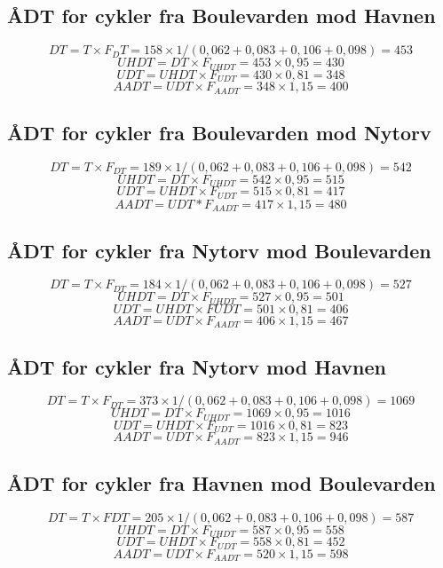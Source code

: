   \subsection{ÅDT for cykler fra Boulevarden mod Havnen}
  \label{sub:cykelaadt}
  $$DT = T \times F_DT = 158 \times 1/(0,062 + 0,083 + 0,106 + 0,098) = 453$$
  $$UHDT = DT \times F_{UHDT} = 453 \times 0,95 = 430$$
  $$UDT = UHDT \times F_{UDT} = 430 \times 0,81 = 348$$
  $$AADT = UDT \times F_{AADT} = 348 \times 1,15 = 400$$


\subsection{ÅDT for cykler fra Boulevarden mod Nytorv}
\label{sub:cykelaadtnytorv}

  $$DT = T \times F_{DT} = 189 \times 1/(0,062+0,083+0,106+0,098) = 542$$
  $$UHDT = DT \times F_{UHDT} = 542 \times 0,95 = 515$$
  $$UDT = UHDT \times F_{UDT} = 515 \times 0,81 = 417$$
  $$AADT = UDT * F_{AADT} = 417 \times 1,15 = 480$$

  \subsection{ÅDT for cykler fra Nytorv mod Boulevarden}
  \label{sub:cykelaadtnytorvb}

  $$DT = T \times F_{DT} = 184 \times 1/(0,062 +0,083+0,106+0,098) = 527$$
  $$UHDT = DT \times F_{UHDT} = 527 \times 0,95 = 501$$
  $$UDT = UHDT \times FUDT = 501 \times 0,81 = 406$$
  $$AADT = UDT \times F_{AADT} = 406 \times 1,15 = 467$$

\subsection{ÅDT for cykler fra Nytorv mod Havnen}
\label{sub:cykelaadtnytorvc}
  $$DT = T \times F_{DT} = 373 \times 1/(0,062 +0,083+0,106+0,098) = 1069$$
  $$UHDT = DT \times F_{UHDT} = 1069 \times 0,95 = 1016$$
  $$UDT = UHDT \times F_{UDT} = 1016 \times 0,81 = 823$$
  $$AADT = UDT \times F_{AADT} = 823 \times 1,15 = 946$$


\subsection{ÅDT for cykler fra Havnen mod Boulevarden}
\label{sub:cykelaadtnytorvd}
   $$DT = T \times FDT = 205 \times 1/(0,062 +0,083+0,106+0,098) = 587$$
  $$UHDT = DT \times F_{UHDT} = 587 \times 0,95 = 558$$
 $$UDT = UHDT \times F_{UDT} = 558 \times 0,81 = 452$$
  $$AADT = UDT \times F_{AADT} = 520 \times 1,15 = 598$$

